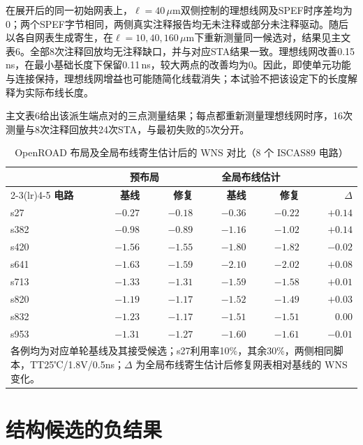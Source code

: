 \documentclass[twocolumn,10pt,fontset=windows]{ctexart}
\begin{document}
在展开后的同一初始网表上，$\ell=40\,\mu$m双侧控制的理想线网及SPEF时序差均为0；两个SPEF字节相同，两侧真实注释报告均无未注释或部分未注释驱动。随后以各自网表生成寄生，在$\ell=10,40,160\,\mu$m下重新测量同一候选对，结果见主文表6。全部8次注释回放均无注释缺口，并与对应STA结果一致。理想线网改善0.15\,ns，在最小基础长度下保留0.11\,ns，较大两点的改善均为0。因此，即使单元功能与连接保持，理想线网增益也可能随简化线载消失；本试验不把该设定下的长度解释为实际布线长度。

主文表6给出该派生端点对的三点测量结果；每点都重新测量理想线网时序，16次测量与8次注释回放共24次STA，与最初失败的5次分开。



\begin{table}[ht]
\centering
\caption{OpenROAD 布局及全局布线寄生估计后的 WNS 对比（8 个 ISCAS89 电路）}
\label{tab:pr8}
\footnotesize
\setlength{\tabcolsep}{2pt}
\begin{tabular}{lrrrrr}
\toprule
 & \multicolumn{2}{c}{\textbf{预布局}} & \multicolumn{2}{c}{\textbf{全局布线估计}} & \\
\cmidrule(lr){2-3}\cmidrule(lr){4-5}
\textbf{电路} & \textbf{基线} & \textbf{修复} & \textbf{基线} & \textbf{修复} & $\Delta$ \\
\midrule
s27  & $-0.27$ & $-0.18$ & $-0.36$ & $-0.22$ & $+0.14$ \\
s382 & $-0.98$ & $-0.89$ & $-1.16$ & $-1.02$ & $+0.14$ \\
s420 & $-1.56$ & $-1.55$ & $-1.80$ & $-1.82$ & $-0.02$ \\
s641 & $-1.63$ & $-1.59$ & $-2.10$ & $-2.02$ & $+0.08$ \\
s713 & $-1.33$ & $-1.31$ & $-1.59$ & $-1.58$ & $+0.01$ \\
s820 & $-1.19$ & $-1.17$ & $-1.52$ & $-1.49$ & $+0.03$ \\
s832 & $-1.23$ & $-1.17$ & $-1.51$ & $-1.51$ & $0.00$ \\
s953 & $-1.31$ & $-1.27$ & $-1.60$ & $-1.61$ & $-0.01$ \\
\bottomrule
\multicolumn{6}{p{0.92\columnwidth}}{\footnotesize 各例均为对应单轮基线及其接受候选；s27利用率10\%，其余30\%，两侧相同脚本，TT25℃/1.8V/0.5ns；$\Delta$ 为全局布线寄生估计后修复网表相对基线的 WNS 变化。}\\
\end{tabular}
\end{table}

\section{结构候选的负结果}
\end{document}
